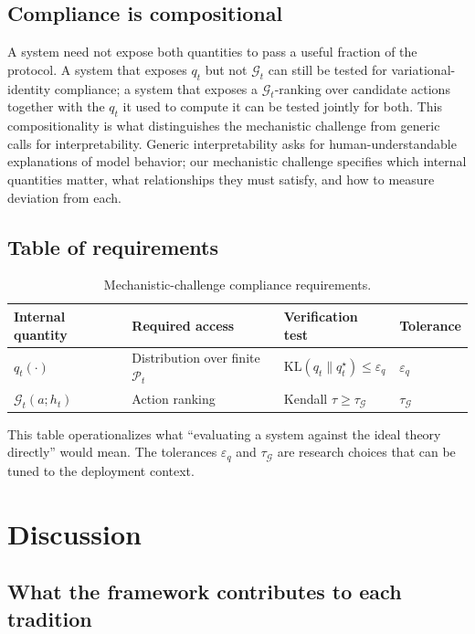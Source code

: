 \documentclass[11pt]{article}
\theoremstyle{remark}
\newcommand{\Gcal}{\mathcal{G}}
\newcommand{\KL}{\mathrm{KL}}
\begin{document}
\subsection{Compliance is compositional}

A system need not expose both quantities to pass a useful fraction of the protocol. A system that exposes \(q_t\) but not \(\Gcal_t\) can still be tested for variational-identity compliance; a system that exposes a \(\Gcal_t\)-ranking over candidate actions together with the \(q_t\) it used to compute it can be tested jointly for both. This compositionality is what distinguishes the mechanistic challenge from generic calls for interpretability. Generic interpretability asks for human-understandable explanations of model behavior; our mechanistic challenge specifies which internal quantities matter, what relationships they must satisfy, and how to measure deviation from each.

\subsection{Table of requirements}

\begin{table}[h]
\centering
\caption{Mechanistic-challenge compliance requirements.}
\begin{tabularx}{\textwidth}{@{}p{}p{}Xl@{}}
\toprule
\textbf{Internal quantity} & \textbf{Required access} & \textbf{Verification test} & \textbf{Tolerance} \\
\midrule
\(q_t(\cdot)\) & Distribution over finite \(\mathcal{P}_t\) & \(\KL(q_t\|q_t^\star) \le \varepsilon_q\) & \(\varepsilon_q\) \\
\(\Gcal_t(a;h_t)\) & Action ranking & Kendall \(\tau \ge \tau_\Gcal\) & \(\tau_\Gcal\) \\
\bottomrule
\end{tabularx}
\end{table}

This table operationalizes what ``evaluating a system against the ideal theory directly'' would mean. The tolerances \(\varepsilon_q\) and \(\tau_\Gcal\) are research choices that can be tuned to the deployment context.

\section{Discussion}

\subsection{What the framework contributes to each tradition}
\end{document}
